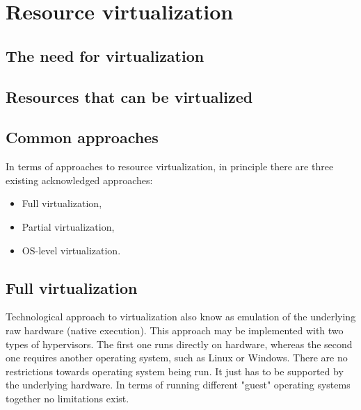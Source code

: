 \documentclass[11pt]{book}
\begin{document}



    \section{Resource virtualization}
    \label{sec:ctx:virt}


      \subsection{The need for virtualization}

      \subsection{Resources that can be virtualized}

      \subsection{Common approaches}

	In terms of approaches to resource virtualization, in principle there are three existing acknowledged approaches:
	\begin{itemize}
		\item{Full virtualization,}
		\item{Partial virtualization,}
		\item{OS-level virtualization.}
	\end{itemize}

      \subsection{Full virtualization}

	Technological approach to virtualization also know as emulation of the underlying raw hardware (native execution). This approach
	may be implemented with two types of hypervisors. The first one runs directly on hardware, whereas the second one requires 
	another operating system, such as Linux or Windows. There are no restrictions towards operating system being run. It just has to 
	be supported by the underlying hardware. In terms of running different "guest" operating systems together no limitations exist.
\end{document}
